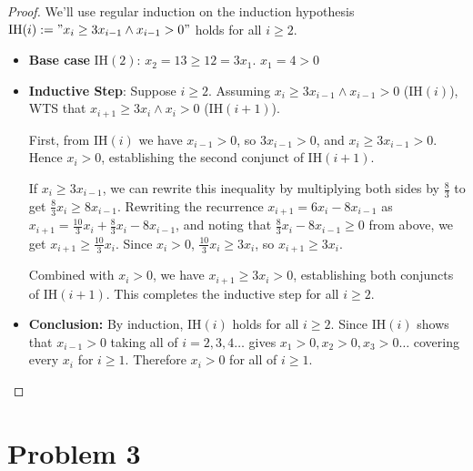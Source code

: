 \documentclass[11pt]{article}
\theoremstyle{definition}
\begin{document}
\begin{proof}
	We'll use regular induction on the induction hypothesis $\text{IH}(i) := "x_i \geq 3x_{i-1} \wedge x_{i-1} > 0"$ holds for all
	$i \geq 2$.

	\begin{itemize}
		\item \textbf{Base case} $\text{IH}(2)$: $x_2 = 13 \geq 12 = 3x_1$. $x_1 = 4 > 0$ \checkmark
		\item \textbf{Inductive Step}: Suppose $i \geq 2$. Assuming $x_i \geq 3x_{i-1} \wedge x_{i-1} > 0$ (IH$(i)$), WTS that $x_{i+1} \geq 3x_i \wedge x_i > 0$ (IH$(i+1)$).

		      First, from IH$(i)$ we have $x_{i-1} > 0$, so $3x_{i-1} > 0$, and $x_i \geq 3x_{i-1} > 0$. Hence $x_i > 0$, establishing the second conjunct of IH$(i+1)$.

		      If $x_i \geq 3x_{i-1}$, we can rewrite this inequality by multiplying both sides by $\frac{8}{3}$ to get $\frac{8}{3}x_i \geq 8x_{i-1}$. Rewriting the recurrence $x_{i+1} = 6x_i - 8x_{i-1}$ as $x_{i+1} = \frac{10}{3}x_i + \frac{8}{3}x_i - 8x_{i-1}$, and noting that $\frac{8}{3}x_i - 8x_{i-1} \geq 0$ from above, we get $x_{i+1} \geq \frac{10}{3}x_i$. Since $x_i > 0$, $\frac{10}{3}x_i \geq 3x_i$, so $x_{i+1} \geq 3x_i$.

		      Combined with $x_i > 0$, we have $x_{i+1} \geq 3x_i > 0$, establishing both conjuncts of IH$(i+1)$. This completes the inductive step for all $i \geq 2$.
		\item \textbf{Conclusion:} By induction, $\text{IH}(i)$ holds for all $i \geq 2$. Since $\text{IH}(i)$ shows that $x_{i-1} > 0$ taking
		      all of $i = 2, 3, 4 \ldots$ gives $x_1 > 0, x_2 > 0, x_3 > 0 \ldots$ covering every $x_i$ for $i \geq 1$. Therefore $x_i > 0$ for all of $i \geq 1$.
	\end{itemize}

\end{proof}

\vspace{1cm}

\section*{Problem 3}
\setcounter{subsection}{0}

\end{document}
